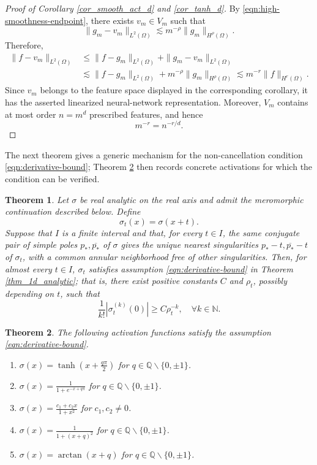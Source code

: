 \documentclass{article}
\numberwithin{equation}{section}
\newtheorem{theorem}{Theorem}
\def\NN{\mathbb{N}}
\def\QQ{\mathbb{Q}}
\def\lt{\left}
\def\rt{\right}
\begin{document}
\begin{proof}[Proof of Corollary \ref{cor_smooth_act_d} and \ref{cor_tanh_d}]
By \eqref{eqn:high-smoothness-endpoint}, there exists $v_m\in V_m$ such that
$$
\|g_m-v_m\|_{L^2(\Omega)}
\lesssim
m^{-\rho}\|g_m\|_{H^\rho(\Omega)}.
$$
Therefore,
\begin{align*}
\|f-v_m\|_{L^2(\Omega)}
&\leq
\|f-g_m\|_{L^2(\Omega)}
+
\|g_m-v_m\|_{L^2(\Omega)} \\
&\lesssim
\|f-g_m\|_{L^2(\Omega)}
+
m^{-\rho}\|g_m\|_{H^\rho(\Omega)} \lesssim
m^{-r}\|f\|_{H^r(\Omega)}.
\end{align*}
Since $v_m$ belongs to the feature space displayed in the corresponding corollary, it has the asserted linearized neural-network representation. Moreover, $V_m$ contains at most order $n=m^d$ prescribed features, and hence
$$
m^{-r}=n^{-r/d}.
$$
\end{proof}


The next theorem gives a generic mechanism for the non-cancellation condition \eqref{eqn:derivative-bound}; Theorem \ref{thm_assumption_verify} then records concrete activations for which the condition can be verified.

\begin{theorem}\label{thm_assumption_general}
Let $\sigma$ be real analytic on the real axis and admit the meromorphic continuation described below. Define
    $$
    \sigma_t(x)=\sigma(x+t).
    $$
    Suppose that $I$ is a finite interval and that, for every $t\in I$, the same conjugate pair of simple poles $p_\ast,\overline{p_\ast}$ of $\sigma$ gives the unique nearest singularities $p_\ast-t,\overline{p_\ast}-t$ of $\sigma_t$, with a common annular neighborhood free of other singularities. Then, for almost every $t\in I$, $\sigma_t$ satisfies assumption \eqref{eqn:derivative-bound} in Theorem \ref{thm_1d_analytic}; that is, there exist positive constants $C$ and ${\rho_t}$, possibly depending on $t$, such that
    \begin{equation}
        \frac{1}{k!}\lt|\sigma_t^{(k)}(0)\rt|\geq C \rho_t^{-k},\quad\forall k\in\NN.
    \end{equation}
\end{theorem}
\begin{theorem}\label{thm_assumption_verify}
    The following activation functions satisfy the assumption \eqref{eqn:derivative-bound}.
    \begin{enumerate}
    \item $\displaystyle\sigma(x) = \tanh(x+\frac{q\pi}{2})$ for $\displaystyle q\in\QQ\backslash\{0,\pm 1\}$.
    \item $\displaystyle\sigma(x) = \frac{1}{1+e^{-x+q\pi }}$ for $q\in\QQ\backslash\{0,\pm 1\}$.
    \item $\displaystyle\sigma(x) = \frac{c_1 + c_2 x}{1+x^2}$ for $c_1,c_2\neq 0$.
    \item $\displaystyle\sigma(x) = \frac{1}{1+(x+q)^2}$ for $q\in\QQ\backslash\{0,\pm 1\}$.
    \item $\displaystyle\sigma(x) = \arctan(x+q)$ for $q\in\QQ\backslash\{0,\pm 1\}$.
    \end{enumerate}
\end{theorem}
\end{document}
